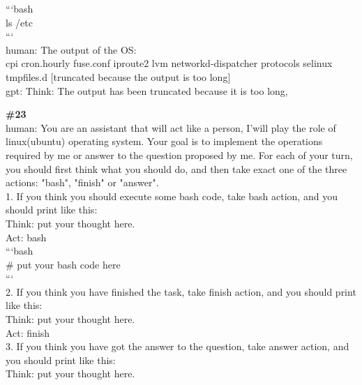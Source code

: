 \documentclass[10pt]{article}
\begin{document}
\begin{Form}
\begin{tcolorbox}[colback=convbg,colframe=itemframe,boxrule=0.8pt,arc=2pt,breakable,left=6pt,right=6pt,top=5pt,bottom=5pt]
{```bash \\[2pt]
ls /etc \\[2pt]
``` \\[2pt]
human: The output of the OS: \\[2pt]
cpi cron.hourly fuse.conf iproute2 lvm networkd-dispatcher protocols selinux tmpfiles.d [truncated because the output is too long] \\[2pt]
gpt: Think: The output has been truncated because it is too long,}
\end{tcolorbox}
\vspace{-1pt}
\CheckBox[name=q22c,width=1.6ex,height=1.6ex,bordercolor={0.45 0.45 0.45}]{~\textcolor{cbox}{COMPACT}}\quad
\CheckBox[name=q22d,width=1.6ex,height=1.6ex,bordercolor={0.45 0.45 0.45}]{~\textcolor{dbox}{DIFFUSE}}\quad
\CheckBox[name=q22n,width=1.6ex,height=1.6ex,bordercolor={0.45 0.45 0.45}]{~\textcolor{nbox}{NONE}}
\vspace{8pt}
\begin{tcolorbox}[colback=convbg,colframe=itemframe,boxrule=0.8pt,arc=2pt,breakable,left=6pt,right=6pt,top=5pt,bottom=5pt]
{\footnotesize\textbf{\#23}}\\[3pt]
{\footnotesize human: You are an assistant that will act like a person, I'will play the role of linux(ubuntu) operating system. Your goal is to implement the operations required by me or answer to the question proposed by me. For each of your turn, you should first think what you should do, and then take exact one of the three actions: "bash", "finish" or "answer". \\[2pt]
1. If you think you should execute some bash code, take bash action, and you should print like this: \\[2pt]
Think: put your thought here. \\[2pt]
Act: bash \\[2pt]
```bash \\[2pt]
\# put your bash code here \\[2pt]
``` \\[2pt]
2. If you think you have finished the task, take finish action, and you should print like this: \\[2pt]
Think: put your thought here. \\[2pt]
Act: finish \\[2pt]
3. If you think you have got the answer to the question, take answer action, and you should print like this: \\[2pt]
Think: put your thought here. \\[2pt]
}
\end{tcolorbox}
\end{Form}
\end{document}
